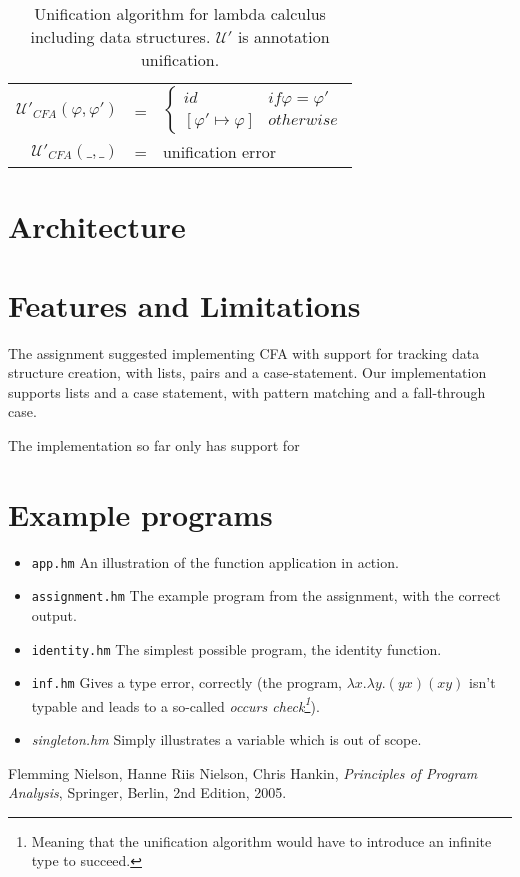 \documentclass[a4paper]{article}
\begin{document}
\begin{table}
\begin{tabular}{rcb{7cm}}
        $\mathcal{U}'_{CFA}(\varphi,\varphi')$ & = & \parbox{\textwidth}{$ \left\{
\begin{array}{ll}
    id & if \varphi = \varphi' \\
    \left[ \varphi' \mapsto \varphi\right] & otherwise 
\end{array}
\right. $ } \\
        $\mathcal{U}'_{CFA}(\_,\_)$ & = & unification error \\
        \hline
    \end{tabular}
    \caption{Unification algorithm for lambda calculus including data structures. $\mathcal{U}'$ is 
    annotation unification.}
    \label{tab:algoU}
\end{table}
\section{Architecture}


\section{Features and Limitations}

The assignment suggested implementing CFA with support for tracking data structure 
creation, with lists, pairs and a case-statement. Our implementation supports lists and 
a case statement, with pattern matching and a fall-through case. 

The implementation so far only has support for 

\section{Example programs}

\begin{itemize}
    \item \texttt{app.hm} An illustration of the function application in action. 
    \item \texttt{assignment.hm} The example program from the assignment, with
        the correct output. 
    \item \texttt{identity.hm} The simplest possible program, the identity
        function. 
    \item \texttt{inf.hm} Gives a type error, correctly (the program, $\lambda
        x.
        \lambda y . (y x) (x y)$ isn't typable and leads to a so-called
        \emph{occurs check\footnote{Meaning that the unification algorithm would
        have to introduce an infinite type to succeed.}}).
    \item \textit{singleton.hm} Simply illustrates a variable which is out of
        scope. 
\end{itemize}



\begin{thebibliography}{9}

  {Flemming Nielson, Hanne Riis Nielson, Chris Hankin},
  \emph{Principles of Program Analysis},
  Springer, Berlin,
  2nd Edition,
  2005.

\end{thebibliography}
\end{document}
